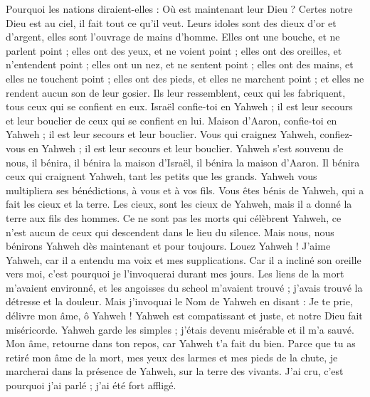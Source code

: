 \begin{multicols}{2}
Pourquoi les nations diraient-elles : Où est maintenant leur Dieu ?
Certes notre Dieu est au ciel, il fait tout ce qu'il veut.
Leurs idoles sont des dieux d'or et d'argent, elles sont l'ouvrage de mains d'homme.
Elles ont une bouche, et ne parlent point ; elles ont des yeux, et ne voient point ;
elles ont des oreilles, et n'entendent point ; elles ont un nez, et ne sentent point ;
elles ont des mains, et elles ne touchent point ; elles ont des pieds, et elles ne marchent point ; et elles ne rendent aucun son de leur gosier.
Ils leur ressemblent, ceux qui les fabriquent, tous ceux qui se confient en eux.
Israël confie-toi en Yahweh ; il est leur secours et leur bouclier de ceux qui se confient en lui.
Maison d'Aaron, confie-toi en Yahweh ; il est leur secours et leur bouclier.
Vous qui craignez Yahweh, confiez-vous en Yahweh ; il est leur secours et leur bouclier.
Yahweh s'est souvenu de nous, il bénira, il bénira la maison d'Israël, il bénira la maison d'Aaron.
Il bénira ceux qui craignent Yahweh, tant les petits que les grands.
Yahweh vous multipliera ses bénédictions, à vous et à vos fils.
Vous êtes bénis de Yahweh, qui a fait les cieux et la terre.
Les cieux, sont les cieux de Yahweh, mais il a donné la terre aux fils des hommes.
Ce ne sont pas les morts qui célèbrent Yahweh, ce n'est aucun de ceux qui descendent dans le lieu du silence.
Mais nous, nous bénirons Yahweh dès maintenant et pour toujours. Louez Yahweh !
\VerseOne{}J'aime Yahweh, car il a entendu ma voix et mes supplications.
Car il a incliné son oreille vers moi, c'est pourquoi je l'invoquerai durant mes jours.
Les liens de la mort m'avaient environné, et les angoisses du scheol m'avaient trouvé ; j'avais trouvé la détresse et la douleur.
Mais j'invoquai le Nom de Yahweh en disant : Je te prie, délivre mon âme, ô Yahweh !
Yahweh est compatissant et juste, et notre Dieu fait miséricorde.
Yahweh garde les simples ; j'étais devenu misérable et il m'a sauvé.
Mon âme, retourne dans ton repos, car Yahweh t'a fait du bien.
Parce que tu as retiré mon âme de la mort, mes yeux des larmes et mes pieds de la chute,
je marcherai dans la présence de Yahweh, sur la terre des vivants.
J'ai cru, c'est pourquoi j'ai parlé ; j'ai été fort affligé.

\end{multicols}

